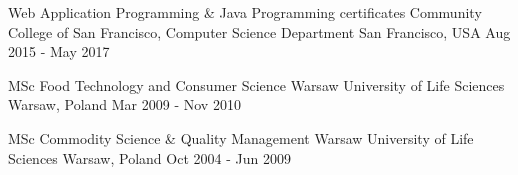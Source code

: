 

\begin{cventries}

  \cvschool
    {Web Application Programming \& Java Programming certificates} %
    {Community College of San Francisco, Computer Science Department} %
    {San Francisco, USA} %
    {Aug 2015 - May 2017} %

  \cvschool
    {MSc Food Technology and Consumer Science} %
    {Warsaw University of Life Sciences} %
    {Warsaw, Poland} %
    {Mar 2009 - Nov 2010} %

  \cvschool
    {MSc Commodity Science \& Quality Management} %
    {Warsaw University of Life Sciences} %
    {Warsaw, Poland} %
    {Oct 2004 - Jun 2009} %

\end{cventries}
